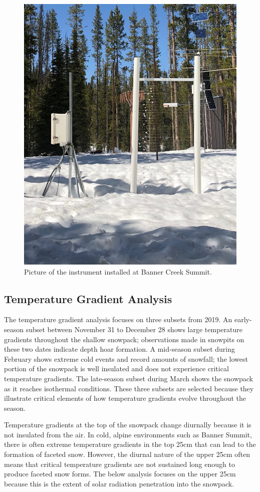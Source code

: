  \begin{figure}[H]
    \centering
    \includegraphics[width=0.7\linewidth]{figures/Banner_Sensor.jpeg}
    \caption{Picture of the instrument installed at Banner Creek Summit.}
    \label{fig:Banner_Sensor}
 \end{figure}
 
\subsection{Temperature Gradient Analysis}
The temperature gradient analysis focuses on three subsets from 2019. An early-season subset between November 31 to December 28 shows large temperature gradients throughout the shallow snowpack; observations made in snowpits on these two dates indicate depth hoar formation. A mid-season subset during February shows extreme cold events and record amounts of snowfall; the lowest portion of the snowpack is well insulated and does not experience critical temperature gradients. The late-season subset during March shows the snowpack as it reaches isothermal conditions. These three subsets are selected because they illustrate critical elements of how temperature gradients evolve throughout the season. 

Temperature gradients at the top of the snowpack change diurnally because it is not insulated from the air. In cold, alpine environments such as Banner Summit, there is often extreme temperature gradients in the top 25cm that can lead to the formation of faceted snow. However, the diurnal nature of the upper 25cm often means that critical temperature gradients are not sustained long enough to produce faceted snow forms. The below analysis focuses on the upper 25cm because this is the extent of solar radiation penetration into the snowpack.  

